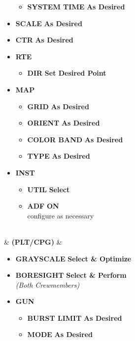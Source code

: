 \documentclass[fontHelvetica]{TechCheck}
\begin{document}
\begin{listlongtable}
\begin{minipage}[t]{\linewidth}
\begin{itemize}
\begin{itemize}
					\item \textbf{SYSTEM TIME} \dotfill \textbf{As Desired}
				\end{itemize}
				\item \textbf{SCALE} \dotfill \textbf{As Desired}
				\item \textbf{CTR} \dotfill \textbf{As Desired}
				\item \textbf{RTE}
				\begin{itemize}
					\item \textbf{DIR} \dotfill \textbf{Set Desired Point}
				\end{itemize}
				\item \textbf{MAP}
				\begin{itemize}
					\item \textbf{GRID} \dotfill \textbf{As Desired}
					\item \textbf{ORIENT} \dotfill \textbf{As Desired}
					\item \textbf{COLOR BAND} \dotfill \textbf{As Desired}
					\item \textbf{TYPE} \dotfill \textbf{As Desired}
				\end{itemize}
				\item \textbf{INST}
				\begin{itemize}
					\item \textbf{UTIL} \dotfill \textbf{Select}
					\item \textbf{ADF} \dotfill \textbf{ON} \\
					\hfill configure as necessary
				\end{itemize}
			\end{itemize}
		\end{minipage} \\
		\midrule
		\textbf{\textbullet} &  \textbf{(PLT/CPG)} &
		\begin{minipage}[t]{\linewidth}
			\begin{itemize}
				\item \textbf{GRAYSCALE} \dotfill \textbf{Select \& Optimize}
				\item \textbf{BORESIGHT} \dotfill \textbf{Select \& Perform} \\
				\hfill \emph{(Both Crewmembers)}
				\item \textbf{GUN}
				\begin{itemize}
					\item \textbf{BURST LIMIT} \dotfill \textbf{As Desired}
					\item \textbf{MODE} \dotfill \textbf{As Desired}
				\end{itemize}

\end{itemize}
\end{minipage}
\end{listlongtable}
\end{document}

